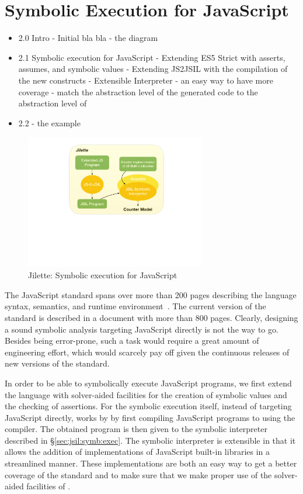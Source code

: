 \section{Symbolic Execution for JavaScript}

\begin{itemize}
   \item 2.0 Intro - Initial bla bla - the diagram 
   \item 2.1 Symbolic execution for JavaScript 
              - Extending ES5 Strict with asserts, assumes, and symbolic values
              - Extending JS2JSIL with the compilation of the new constructs 
              - Extensible Interpreter 
                   - an easy way to have more coverage 
                   - match the abstraction level of the generated code to the abstraction level of \rosette 
    \item 2.2 - the example 
\end{itemize}

\begin{figure}[t]
\centering
\includegraphics[width=0.7\textwidth]{figures/jilette.pdf}
\caption{Jilette: Symbolic execution for JavaScript}
\label{fig:jilette:diagram}
\end{figure}

The JavaScript standard spans over more than 200 pages describing the language syntax, semantics, 
and runtime environment~\cite{ecma}. The current version of the standard is described in a document with 
more than 800 pages. Clearly, designing a sound symbolic analysis targeting JavaScript directly 
is not the way to go. Besides being error-prone, such a task would require a great amount of engineering effort, 
which would scarcely pay off given the continuous releases of new versions of the standard. 

In order to be able to symbolically execute JavaScript programs, we first extend the language 
with solver-aided facilities for the creation of symbolic values and the checking of assertions. 
For the symbolic execution itself, instead of targeting JavaScript directly, \jilette works by by first 
compiling JavaScript programs to \jsil using the \JSComp compiler.
The obtained \jsil program is then given to the \jsil symbolic interpreter described in \S\ref{sec:jsil:symb:exec}. 
The symbolic interpreter is extensible in that it allows the addition of \rosette implementations of 
JavaScript built-in libraries in a streamlined manner.  
These implementations are both an easy way to get a better coverage of the standard and 
to make sure that we make proper use of the solver-aided facilities of \rosette.    

